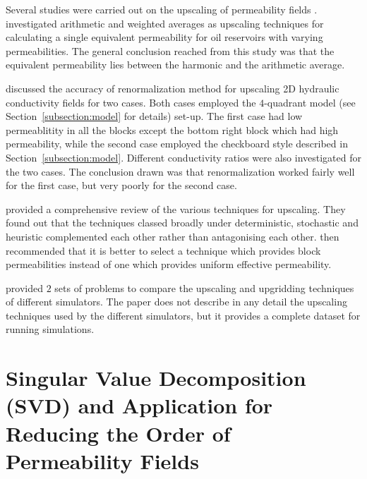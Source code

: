\documentclass[preprint,12pt]{elsarticle}
\begin{document}
Several studies were carried out on the upscaling of permeability fields \cite{Christie_2001SPE10Model, Ewing_1997, Hasting_2001, King1996, Indelman_1993, Vereecken_2007, Wen_1996, Yeo2001}. \citet{Cardwell_1945} investigated arithmetic and weighted averages as upscaling techniques for calculating a single equivalent permeability for oil reservoirs with varying permeabilities. The general conclusion reached from this study was that the equivalent permeability lies between the harmonic and the arithmetic average.  

\citet{Yeo2001} discussed the accuracy of renormalization method for upscaling 2D hydraulic conductivity fields for two cases. Both cases employed the $4$-quadrant model (see Section~\ref{subsection:model} for details) set-up. The first case had low permeablitity in all the blocks except the bottom right block which had high permeability, while the second case employed the checkboard style described in Section~\ref{subsection:model}. Different conductivity ratios were also investigated for the two cases. The conclusion drawn was that renormalization worked fairly well for the first case, but very poorly for the second case.

\citet{Renard_1997} provided a comprehensive review of the various techniques for upscaling. They found out that the techniques classed broadly under deterministic, stochastic and heuristic complemented each other rather than antagonising each other. \citet{Renard_1997} then recommended that it is better to select a technique which provides block permeabilities instead of one which provides uniform effective permeability.

\citet{Christie_2001SPE10Model} provided $2$ sets of problems to compare the upscaling and upgridding techniques of different simulators. The paper does not describe in any detail the upscaling techniques used by the different simulators, but it provides a complete dataset for running simulations.


\section{Singular Value Decomposition (SVD) and Application for Reducing the Order of Permeability Fields}\label{section:svd}
\end{document}
